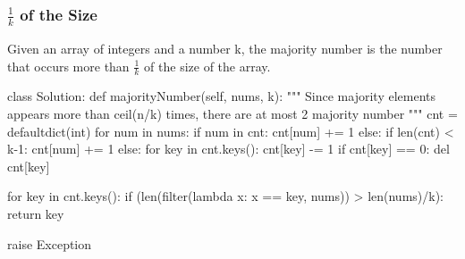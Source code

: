 \subsubsection{$\frac{1}{k}$ of the Size}
Given an array of integers and a number k, the majority number is the number that occurs more than $\frac{1}{k}$ of the size of
the array.
\begin{python}
class Solution:
    def majorityNumber(self, nums, k):
        """
        Since majority elements appears more 
        than ceil(n/k) times, there are at 
        most 2 majority number
        """
        cnt = defaultdict(int)
        for num in nums:
            if num in cnt:
                cnt[num] += 1
            else:
                if len(cnt) < k-1:
                    cnt[num] += 1
                else:
                    for key in cnt.keys():
                        cnt[key] -= 1
                        if cnt[key] == 0:
                            del cnt[key]

        for key in cnt.keys():
            if (len(filter(lambda x: x == key, nums)) 
                > len(nums)/k):
                return key

        raise Exception
\end{python}

